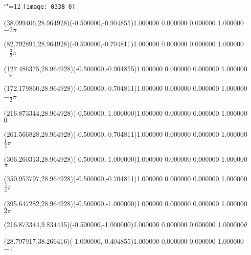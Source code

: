 \documentclass[12pt]{article}
\begin{document}
\makeatletter%
\let\ASYencoding\f@encoding%
\let\ASYfamily\f@family%
\let\ASYseries\f@series%
\let\ASYshape\f@shape%
\makeatother%
{\catcode`"=12%
\texttt{[image: 0338\_0]}%
}%
\kern -403.633767pt%
%
%
\fontsize{12.000000}{14.400000}\selectfont%
\usefont{\ASYencoding}{\ASYfamily}{\ASYseries}{\ASYshape}%
\ASYalignT(38.099406,28.964928)(-0.500000,-0.904855){1.000000 0.000000 0.000000 1.000000}{\vphantom{$10^4$}$-2\pi$}%
%
%
\fontsize{12.000000}{14.400000}\selectfont%
\ASYalignT(82.792891,28.964928)(-0.500000,-0.704811){1.000000 0.000000 0.000000 1.000000}{\vphantom{$10^4$}$-\frac{3}{2}\pi$}%
%
%
\fontsize{12.000000}{14.400000}\selectfont%
\ASYalignT(127.486375,28.964928)(-0.500000,-0.904855){1.000000 0.000000 0.000000 1.000000}{\vphantom{$10^4$}$-\pi$}%
%
%
\fontsize{12.000000}{14.400000}\selectfont%
\ASYalignT(172.179860,28.964928)(-0.500000,-0.704811){1.000000 0.000000 0.000000 1.000000}{\vphantom{$10^4$}$-\frac{1}{2}\pi$}%
%
%
\fontsize{12.000000}{14.400000}\selectfont%
\ASYalignT(216.873344,28.964928)(-0.500000,-1.000000){1.000000 0.000000 0.000000 1.000000}{\vphantom{$10^4$}$0$}%
%
%
\fontsize{12.000000}{14.400000}\selectfont%
\ASYalignT(261.566828,28.964928)(-0.500000,-0.704811){1.000000 0.000000 0.000000 1.000000}{\vphantom{$10^4$}$\frac{1}{2}\pi$}%
%
%
\fontsize{12.000000}{14.400000}\selectfont%
\ASYalignT(306.260313,28.964928)(-0.500000,-1.000000){1.000000 0.000000 0.000000 1.000000}{\vphantom{$10^4$}$\pi$}%
%
%
\fontsize{12.000000}{14.400000}\selectfont%
\ASYalignT(350.953797,28.964928)(-0.500000,-0.704811){1.000000 0.000000 0.000000 1.000000}{\vphantom{$10^4$}$\frac{3}{2}\pi$}%
%
%
\fontsize{12.000000}{14.400000}\selectfont%
\ASYalignT(395.647282,28.964928)(-0.500000,-1.000000){1.000000 0.000000 0.000000 1.000000}{\vphantom{$10^4$}$2\pi$}%
%
%
\fontsize{12.000000}{14.400000}\selectfont%
\ASYalignT(216.873344,9.834435)(-0.500000,-1.000000){1.000000 0.000000 0.000000 1.000000}{$\theta$}%
%
%
\fontsize{12.000000}{14.400000}\selectfont%
\ASYalignT(28.797917,38.266416)(-1.000000,-0.404855){1.000000 0.000000 0.000000 1.000000}{\vphantom{$10^4$}$-1$}%
\end{document}

